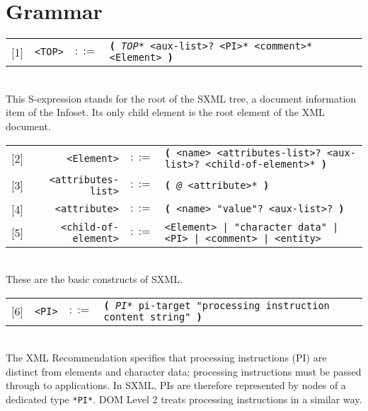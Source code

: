 \documentclass[10pt]{article}
\begin{document}
\section{Grammar}
\begin{tabular}{rrcp{2.8in}}
{[}1{]} & \texttt{<TOP>} &  $::=$ & \texttt{\textbf{(} {\itshape *TOP*} <aux-list>? <PI>* <comment>* <Element> \textbf{)} } \\
\end{tabular}
\\
This S-expression stands for the root of the SXML tree, a
document information item of the Infoset. Its only child element is
the root element of the XML document.

\begin{tabular}{rrcp{2.8in}}
{[}2{]} & \texttt{<Element>} &  $::=$ & \texttt{\textbf{(} <name> <attributes-list>? <aux-list>? <child-of-element>* \textbf{)} } \\
{[}3{]} & \texttt{<attributes-list>} &  $::=$ & \texttt{\textbf{(} {\itshape @} <attribute>* \textbf{)} } \\
{[}4{]} & \texttt{<attribute>} &  $::=$ & \texttt{\textbf{(} <name> "value"? <aux-list>? \textbf{)} } \\
{[}5{]} & \texttt{<child-of-element>} &  $::=$ & \texttt{<Element> | "character data" | <PI> | <comment> | <entity> } \\
\end{tabular}
\\
These are the basic constructs of SXML.

\begin{tabular}{rrcp{2.8in}}
{[}6{]} & \texttt{<PI>} &  $::=$ & \texttt{\textbf{(} {\itshape *PI*} pi-target "processing instruction content string" \textbf{)} } \\
\end{tabular}
\\
The XML Recommendation specifies that processing instructions (PI) are distinct from elements and character data; processing
instructions must be passed through to applications. In SXML, PIs are
therefore represented by nodes of a dedicated type \texttt{*PI*}. DOM Level 2 treats processing instructions in a similar way.
\end{document}
